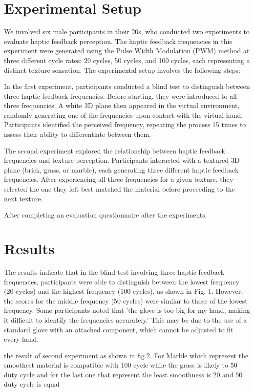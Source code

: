 \documentclass[a4paper,twocolumn]{article}
\begin{document}
\section{Experimental Setup}
We involved six male participants in their 20s, who conducted two experiments to evaluate haptic feedback perception. The haptic feedback frequencies in this experiment were generated using the Pulse Width Modulation (PWM) method at three different cycle rates: 20 cycles, 50 cycles, and 100 cycles, each representing a distinct texture sensation. The experimental setup involves the following steps: \par
In the first experiment, participants conducted a blind test to distinguish between three haptic feedback frequencies. Before starting, they were introduced to all three frequencies. A white 3D plane then appeared in the virtual environment, randomly generating one of the frequencies upon contact with the virtual hand. Participants identified the perceived frequency, repeating the process 15 times to assess their ability to differentiate between them.\par
The second experiment explored the relationship between haptic feedback frequencies and texture perception. Participants interacted with a textured 3D plane (brick, grass, or marble), each generating three different haptic feedback frequencies. After experiencing all three frequencies for a given texture, they selected the one they felt best matched the material before proceeding to the next texture.\par
After completing an evaluation questionnaire after the experiments. 					

\section{Results}
The results indicate that in the blind test involving three haptic feedback frequencies, participants were able to distinguish between the lowest frequency (20 cycles) and the highest frequency (100 cycles), as shown in Fig. 1. However, the scores for the middle frequency (50 cycles) were similar to those of the lowest frequency. Some participants noted that 'the glove is too big for my hand, making it difficult to identify the frequencies accurately.' This may be due to the use of a standard glove with an attached component, which cannot be adjusted to fit every hand.\par
the result of second experiment as shown in fig.2. For Marble which represent the smoothest material is compatible with 100 cycle while the grass is likely to 50 duty cycle and for the last one that represent the least smoothness is 20 and 50 duty cycle is equal
\end{document}
